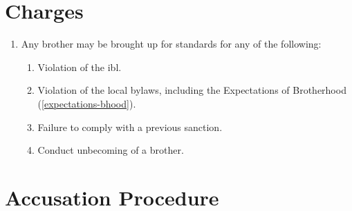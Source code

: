 \section{Charges}

	\begin{enumerate}
		\item Any brother may be brought up for standards for any of the following:

		\begin{enumerate}
			\item Violation of the \gls{ibl}.
			\item Violation of the local bylaws, including the Expectations of Brotherhood (\autoref{expectations-bhood}).
			\item Failure to comply with a previous sanction.
			\item Conduct unbecoming of a brother.
		\end{enumerate}

	\end{enumerate}

\section{Accusation Procedure}

